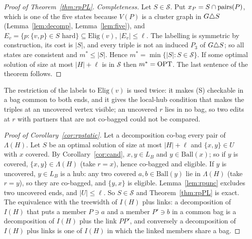 \begin{proof}[Proof of Theorem~\ref{thm:rpPL}]
\emph{Completeness.} Let $S\in\mathcal S$. Put $x_P=S\cap\mathrm{pairs}(P)$, which is one of the five states because $V(P)$ is a cluster graph in $G\triangle S$ (Lemma~\ref{lem:decomp}, Lemma~\ref{lem:five}), and $E_v=\{p:\{v,p\}\in S\text{ hard}\}\subseteq\mathrm{Elig}(v)$, $|E_v|\le\ell$. The labelling is symmetric by construction, its cost is $|S|$, and every triple is not an induced $P_3$ of $G\triangle S$; so all states are consistent and $m^*\le|S|$. Hence $m^*=\min\{|S|:S\in\mathcal S\}$. If some optimal solution of size at most $|H|+\ell$ is in $\mathcal S$ then $m^*=\mathrm{OPT}$. The last sentence of the theorem follows.
\end{proof}
The restriction of the labels to $\mathrm{Elig}(v)$ is used twice: it makes (S) checkable in a bag common to both ends, and it gives the local-hub condition that makes the triples at an uncovered vertex visible; an uncovered $r$ lies in no bag, so two edits at $r$ with partners that are not co-bagged could not be compared.

\begin{proof}[Proof of Corollary~\ref{cor:rpstatic}]
Let a decomposition co-bag every pair of $\Lambda(H)$. Let $S$ be an optimal solution of size at most $|H|+\ell$ and $\{x,y\}\in U$ with $x$ covered. By Corollary~\ref{cor:cand}, $x,y\in L_B$ and $y\in\mathrm{Ball}(x)$; so if $y$ is covered, $\{x,y\}\in\Lambda(H)$ (take $r=x$), hence co-bagged and eligible. If $y$ is uncovered, $y\in L_B$ is a hub: any two covered $a,b\in\mathrm{Ball}(y)$ lie in $\Lambda(H)$ (take $r=y$), so they are co-bagged, and $\{y,x\}$ is eligible. Lemma~\ref{lem:rpunc} excludes two uncovered ends, and $|U|\le\ell$. So $S\in\mathcal S$ and Theorem~\ref{thm:rpPL} is exact. The equivalence with the treewidth of $I(H)$ plus links: a decomposition of $I(H)$ that puts a member $P\ni a$ and a member $P'\ni b$ in a common bag is a decomposition of $I(H)$ plus the link $PP'$, and conversely a decomposition of $I(H)$ plus links is one of $I(H)$ in which the linked members share a bag.
\end{proof}

